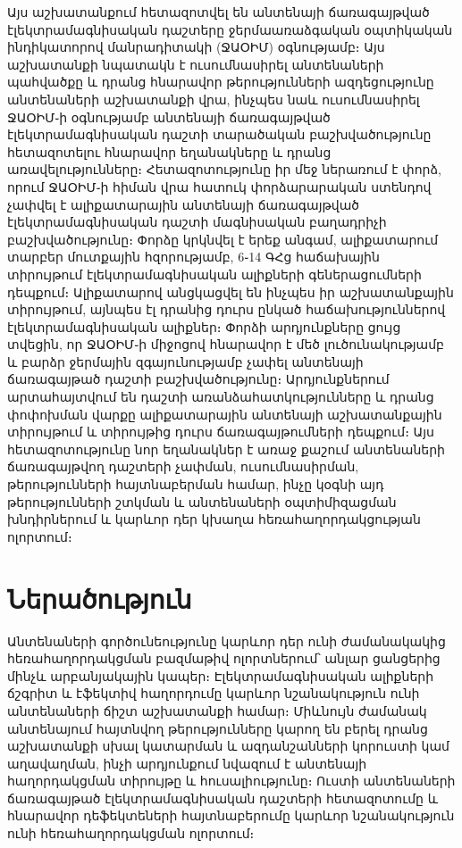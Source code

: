 \documentclass[12pt, fleqn]{report}
\begin{document}

Այս աշխատանքում հետազոտվել են անտենայի ճառագայթված էլեկտրամագնիսական դաշտերը ջերմաառաձգական օպտիկական ինդիկատորով մանրադիտակի (ՋԱՕԻՄ) օգնությամբ։ Այս աշխատանքի նպատակն է ուսումնասիրել անտենաների պահվածքը և դրանց հնարավոր թերությունների ազդեցությունը անտենաների աշխատանքի վրա, ինչպես նաև ուսումնասիրել ՋԱՕԻՄ֊ի օգնությամբ անտենայի ճառագայթված էլեկտրամագնիսական դաշտի տարածական բաշխվածությունը հետազոտելու հնարավոր եղանակները և դրանց առավելությունները։ Հետազոտությունը իր մեջ ներառում է փորձ, որում ՋԱՕԻՄ֊ի հիման վրա հատուկ փորձարարական ստենդով չափվել է ալիքատարային անտենայի ճառագայթված էլեկտրամագնիսական դաշտի մագնիսական բաղադրիչի բաշխվածությունը։ Փորձը կրկնվել է երեք անգամ, ալիքատարում տարբեր մուտքային հզորությամբ, 6֊14 ԳՀց հաճախային տիրույթում էլեկտրամագնիսական ալիքների գեներացումների դեպքում։ Ալիքատարով անցկացվել են ինչպես իր աշխատանքային տիրույթում, այնպես էլ դրանից դուրս ընկած հաճախություններով էլեկտրամագնիսական ալիքներ։ Փորձի արդյունքները ցույց տվեցին, որ ՋԱՕԻՄ֊ի միջոցով հնարավոր է մեծ լուծունակությամբ և բարձր ջերմային զգայունությամբ չափել անտենայի ճառագայթած դաշտի բաշխվածությունը։ Արդյունքներում արտահայտվում են դաշտի առանձահատկությունները և դրանց փոփոխման վարքը ալիքատարային անտենայի աշխատանքային տիրույթում և տիրույթից դուրս ճառագայթումների դեպքում։ Այս հետազոտությունը նոր եղանակներ է առաջ քաշում անտենաների ճառագայթվող դաշտերի չափման, ուսումնասիրման, թերությունների հայտնաբերման համար, ինչը կօգնի այդ թերությունների շտկման և անտենաների օպտիմիզացման խնդիրներում և կարևոր դեր կխաղա հեռահաղորդակցության ոլորտում։

\newpage

\renewcommand{\contentsname}{
    \vspace{-64pt}
    \normalfont\Large\bfseries
    Բովանդակություն
    \vspace{-24pt}
}
\tableofcontents

\newpage

\captionsetup[figure]{name=Նկ․}
\captionsetup{justification=raggedright, width=1.0\textwidth, font=small, format=hang}

\section* {Ներածություն}

Անտենաների գործունեությունը կարևոր դեր ունի ժամանակակից հեռահաղորդակցման բազմաթիվ ոլորտներում՝ անլար ցանցերից մինչև արբանյակային կապեր։ Էլեկտրամագնիսական ալիքների ճշգրիտ և էֆեկտիվ հաղորդումը կարևոր նշանակություն ունի անտենաների ճիշտ աշխատանքի համար։ Միևնույն ժամանակ անտենայում հայտնվող թերությունները կարող են բերել դրանց աշխատանքի սխալ կատարման և ազդանշանների կորուստի կամ աղավաղման, ինչի արդյունքում նվազում է անտենայի հաղորդակցման տիրույթը և հուսալիությունը։ Ուստի անտենաների ճառագայթած էլեկտրամագնիսական դաշտերի հետազոտումը և հնարավոր դեֆեկտեների հայտնաբերումը կարևոր նշանակություն ունի հեռահաղորդակցման ոլորտում։
\end{document}
